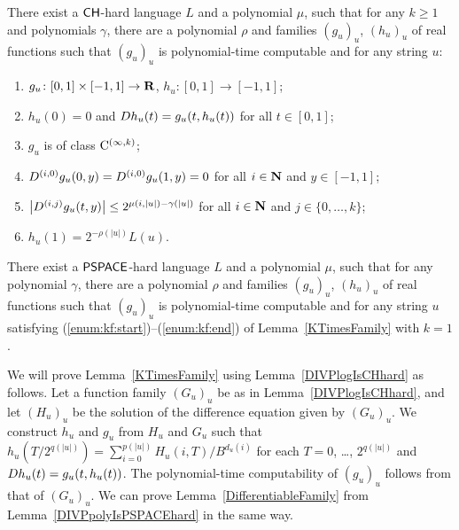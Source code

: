  \begin{lemma}
  \label{KTimesFamily}
  There exist a $\mathsf{CH}$-hard language $L$ and a polynomial $\mu$,
  such that for any $k \ge 1$ and polynomials $\gamma$,
  there are a polynomial $\rho$ and families $(g_u)_u$, $(h_u)_u$ of real functions
  such that $(g_u)_u$ is polynomial-time computable and for any string $u$:
  \begin{enumerate}
   \item \label{enum:kf:start}
	 $g_u\colon [0,1] \times [-1,1]\to \mathbf R$, $h_u\colon [0,1] \to [-1,1]$;
   \item \label{enum:equation}
	 $h_u(0) = 0$ and $D h_u(t) = g_u(t, h_u(t))$ for all $t \in [0,1]$;
   \item \label{enum:differentiability}
         $g_u$ is of class $\mathrm C^{(\infty, k)}$;
   \item \label{enum:boundary}
	 $
	 D^{(i, 0)} g_u(0,y) = D^{(i, 0)} g_u(1,y) = 0
         $ for all $i \in \mathbf N$ and $y \in [-1,1]$;
   \item \label{enum:smooth}
	 $
	 \left|D^{(i,j)} g_u(t,y)\right| \le 2^{\mu(i, |u|) - \gamma(|u|)}
         $ for all $i \in \mathbf N$ and $j \in \{0, \dots, k\}$;
   \item \label{enum:kf:end}
	 $h_u(1) = 2^{-\rho(|u|)} L(u)$.
  \end{enumerate}
 \end{lemma}

\begin{lemma}
 \label{DifferentiableFamily}
 There exist a $\mathsf{PSPACE}$-hard language $L$ and a polynomial $\mu$,
 such that for any polynomial $\gamma$,
 there are a polynomial $\rho$ and families $(g_u)_u$, $(h_u)_u$ of real functions
 such that $(g_u)_u$ is polynomial-time computable and for any string $u$
 satisfying (\ref{enum:kf:start})--(\ref{enum:kf:end}) of Lemma~\ref{KTimesFamily} with $k = 1$.
\end{lemma}

We will prove Lemma~\ref{KTimesFamily} using Lemma~\ref{DIVPlogIsCHhard} as follows.
Let a function family $(G_u)_u$ be as in Lemma~\ref{DIVPlogIsCHhard},
and let $(H_u)_u$ be the solution of the difference equation given by $(G_u)_u$.
We construct $h_u$ and $g_u$ from $H_u$ and $G_u$ 
such that $h_u(T/2^{q(|u|)}) = \sum^{p(|u|)}_{i = 0} H_u(i, T)/B^{d_u(i)}$ for each $T = 0$, \ldots, $2^{q(|u|)}$
and $D h_u(t) = g_u(t, h_u(t))$.
The polynomial-time computability of $(g_u)_u$ follows from that of $(G_u)_u$.
We can prove Lemma~\ref{DifferentiableFamily} from Lemma~\ref{DIVPpolyIsPSPACEhard} in the same way.

